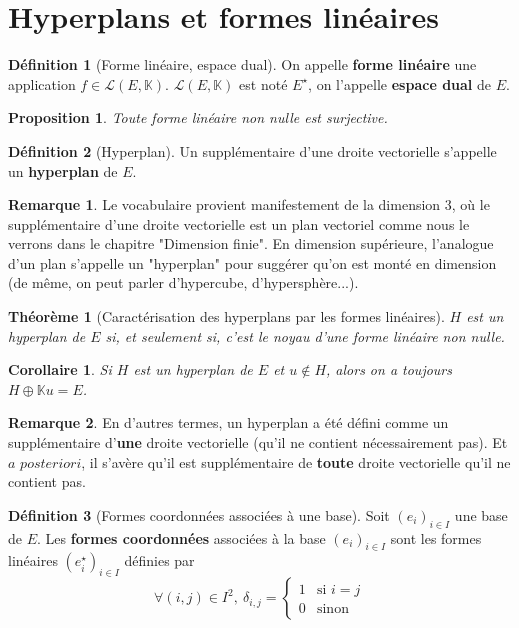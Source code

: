 \documentclass[french]{book}
\newcommand{\K}{\mathbb{K}}
\newcommand{\st}{^\star}
\theoremstyle{plain}
\newtheorem{thm}{Théorème}[chapter]
\newtheorem{prop}{Proposition}[chapter]
\newtheorem{cor}{Corollaire}[chapter]
\theoremstyle{definition}
\newtheorem{dfn}{Définition}[chapter]
\newtheorem{rmq}{Remarque}[chapter]
\theoremstyle{remark}
\begin{document}
\section{Hyperplans et formes linéaires} %
\begin{dfn}[Forme linéaire, espace dual]
	On appelle \textbf{forme linéaire} une application $f\in\mathcal{L}(E,\K)$. $\mathcal{L}(E,\K)$ est noté $E\st$, on l'appelle \textbf{espace dual} de $E$.
\end{dfn}
\begin{prop}
	Toute forme linéaire non nulle est surjective.
\end{prop}
\begin{dfn}[Hyperplan]
	Un supplémentaire d'une droite vectorielle s'appelle un \textbf{hyperplan} de $E$.
\end{dfn}
\begin{rmq}
	Le vocabulaire provient manifestement de la dimension $3$, où le supplémentaire d'une droite vectorielle est un plan vectoriel comme nous le verrons dans le chapitre "Dimension finie". En dimension supérieure, l'analogue d'un plan s'appelle un "hyperplan" pour suggérer qu'on est monté en dimension (de même, on peut parler d'hypercube, d'hypersphère...).
\end{rmq}
\begin{thm}[Caractérisation des hyperplans par les formes linéaires]
	$H$ est un hyperplan de $E$ si, et seulement si, c'est le noyau d'une forme linéaire non nulle.
\end{thm}
\begin{cor}
	Si $H$ est un hyperplan de $E$ et $u\notin H$, alors on a toujours $H\oplus\K u=E$.
\end{cor}
\begin{rmq}
	En d'autres termes, un hyperplan a été défini comme un supplémentaire d'\textbf{une} droite vectorielle (qu'il ne contient nécessairement pas). Et $a$ $posteriori$, il s'avère qu'il est supplémentaire de \textbf{toute} droite vectorielle qu'il ne contient pas.
\end{rmq}
\begin{dfn}[Formes coordonnées associées à une base]
	Soit $(e_i)_{i\in I}$ une base de $E$. Les \textbf{formes coordonnées} associées à la base $(e_i)_{i\in I}$ sont les formes linéaires $(e_i\st)_{i\in I}$ définies par $$\forall(i,j)\in I^2,\ \delta_{i,j}=\left \{\begin{array}{ll}1&\text{si }i=j \\ 0&\text{sinon}\end{array}\right.$$ 
\end{dfn}
\end{document}
